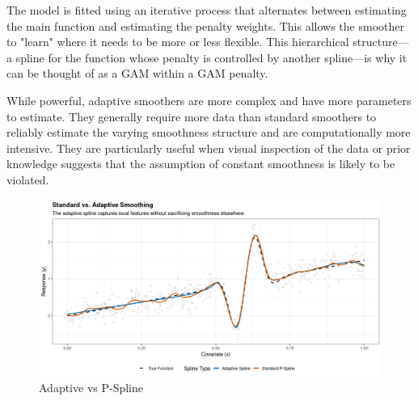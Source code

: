 \documentclass[11pt, a4paper]{article}
\begin{document}
\begin{itemize}
The model is fitted using an iterative process that alternates between estimating the main function and estimating the penalty weights. This allows the smoother to "learn" where it needs to be more or less flexible. This hierarchical structure—a spline for the function whose penalty is controlled by another spline—is why it can be thought of as a GAM within a GAM penalty.

While powerful, adaptive smoothers are more complex and have more parameters to estimate. They generally require more data than standard smoothers to reliably estimate the varying smoothness structure and are computationally more intensive. They are particularly useful when visual inspection of the data or prior knowledge suggests that the assumption of constant smoothness is likely to be violated.
\begin{figure}
 \centering
 \includegraphics[width=1\linewidth]{adaptive_spline.png}
 \caption{Adaptive vs P-Spline}
\end{figure}


\end{itemize}
\end{document}
